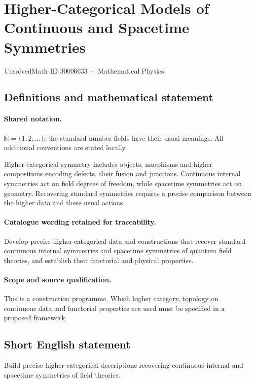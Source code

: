 \documentclass[11pt]{article}
\begin{document}
\setcounter{section}{30006632}
\section{Higher-Categorical Models of Continuous and Spacetime Symmetries}\label{30006633}
{\small UnsolvedMath ID 30006633 · Mathematical Physics}
\subsection{Definitions and mathematical statement}

\paragraph{Shared notation.}$\mathbb N=\{1,2,\ldots\}$; the standard number fields have their usual meanings. All additional conventions are stated locally.


Higher-categorical symmetry includes objects, morphisms and higher compositions encoding defects, their fusion and junctions. Continuous internal symmetries act on field degrees of freedom, while spacetime symmetries act on geometry. Recovering standard symmetries requires a precise comparison between the higher data and these usual actions.

\paragraph{Catalogue wording retained for traceability.}
Develop precise higher-categorical data and constructions that recover standard continuous internal symmetries and spacetime symmetries of quantum field theories, and establish their functorial and physical properties.

\paragraph{Scope and source qualification.}This is a construction programme. Which higher category, topology on continuous data and functorial properties are used must be specified in a proposed framework.
\subsection{Short English statement}
Build precise higher-categorical descriptions recovering continuous internal and spacetime symmetries of field theories.
\end{document}
